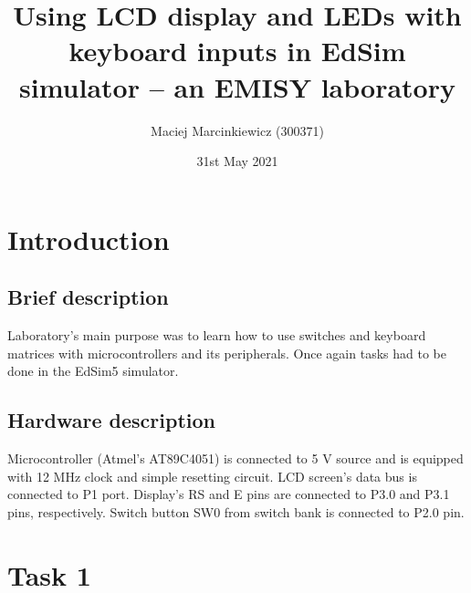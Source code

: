 \documentclass{article}
\title{Using LCD display and LEDs with keyboard inputs in EdSim simulator -- an EMISY laboratory}
\author{Maciej Marcinkiewicz (300371)}
\date{31st May 2021}
\begin{document}
\maketitle

\section{Introduction}
\subsection{Brief description}
Laboratory's main purpose was to learn how to use switches and keyboard matrices
with microcontrollers and its peripherals. Once again tasks had to be done
in the EdSim5 simulator.

\subsection{Hardware description}
Microcontroller (Atmel’s AT89C4051) is connected to 5 V source and is equipped with 12 MHz clock and simple resetting circuit.
LCD screen's data bus is connected to P1 port. Display's RS and E pins are
connected to P3.0 and P3.1 pins, respectively. Switch button SW0 from switch
bank is connected to P2.0 pin.

\section{Task 1}
\end{document}
